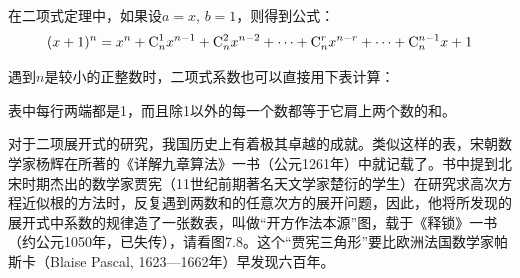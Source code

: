 在二项式定理中，如果设$a=x$, $ b=1$，则得到公式：
\[(x+1)^{n}=x^{n}+\comb{n}{1}x^{n-1}+\comb{n}{2}x^{n-2}+\cdots+\comb{n}{r}x^{n-r}+\cdots+\comb{n}{n-1}x+1\]

遇到$n$是较小的正整数时，二项式系数也可以直接用下表计算：
\begin{center}
\end{center}

表中每行两端都是1，而且除1以外的每一个数都等于它肩上两个数的和。

对于二项展开式的研究，我国历史上有着极其卓越的成就。类似这样的表，宋朝数学家杨辉在所著的《详解九章算法》一书（公元1261年）中就记载了。书中提到北宋时期杰出的数学家贾宪（11世纪前期著名天文学家楚衍的学生）在研究求高次方程近似根的方法时，反复遇到两数和的任意次方的展开问题，因此，他将所发现的展开式中系数的规律造了一张数表，叫做“开方作法本源”图，载于《释锁》一书（约公元1050年，已失传），请看图7.8。这个“贾宪三角形”要比欧洲法国数学家帕斯卡（Blaise Pascal, 1623—1662年）早发现六百年。


